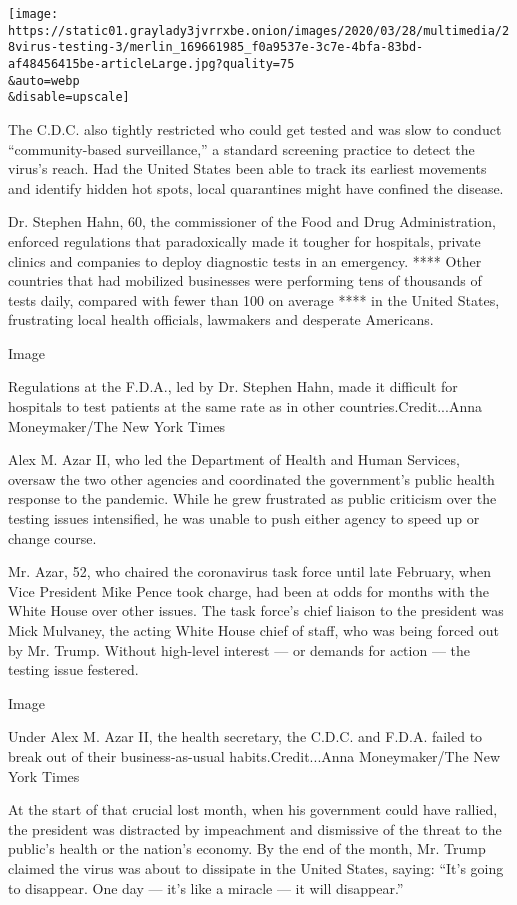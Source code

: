 \texttt{[image: https://static01.graylady3jvrrxbe.onion/images/2020/03/28/multimedia/28virus-testing-3/merlin\_169661985\_f0a9537e-3c7e-4bfa-83bd-af48456415be-articleLarge.jpg?quality=75\\\&auto=webp\\\&disable=upscale]}

The C.D.C. also tightly restricted who could get tested and was slow to
conduct ``community-based surveillance,'' a standard screening practice
to detect the virus's reach. Had the United States been able to track
its earliest movements and identify hidden hot spots, local quarantines
might have confined the disease.

Dr. Stephen Hahn, 60, the commissioner of the Food and Drug
Administration, enforced regulations that paradoxically made it tougher
for hospitals, private clinics and companies to deploy diagnostic tests
in an emergency. **** Other countries that had mobilized businesses were
performing tens of thousands of tests daily, compared with fewer than
100 on average **** in the United States, frustrating local health
officials, lawmakers and desperate Americans.

Image

Regulations at the F.D.A., led by Dr. Stephen Hahn, made it difficult
for hospitals to test patients at the same rate as in other
countries.Credit...Anna Moneymaker/The New York Times

Alex M. Azar II, who led the Department of Health and Human Services,
oversaw the two other agencies and coordinated the government's public
health response to the pandemic. While he grew frustrated as public
criticism over the testing issues intensified, he was unable to push
either agency to speed up or change course.

Mr. Azar, 52, who chaired the coronavirus task force until late
February, when Vice President Mike Pence took charge, had been at odds
for months with the White House over other issues. The task force's
chief liaison to the president was Mick Mulvaney, the acting White House
chief of staff, who was being forced out by Mr. Trump. Without
high-level interest --- or demands for action --- the testing issue
festered.

Image

Under Alex M. Azar II, the health secretary, the C.D.C. and F.D.A.
failed to break out of their business-as-usual habits.Credit...Anna
Moneymaker/The New York Times

At the start of that crucial lost month, when his government could have
rallied, the president was distracted by impeachment and dismissive of
the threat to the public's health or the nation's economy. By the end of
the month, Mr. Trump claimed the virus was about to dissipate in the
United States, saying: ``It's going to disappear. One day --- it's like
a miracle --- it will disappear.''

